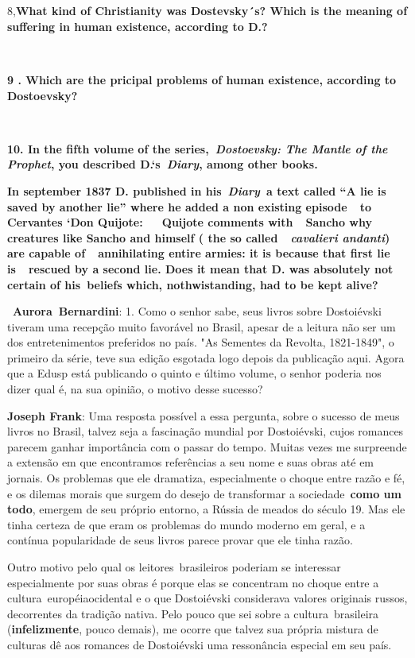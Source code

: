 ~

~

8,\textbf{What kind of Christianity was Dostevsky´s? Which is the
meaning of suffering in human existence, according to D.?}

\textbf{~}

\textbf{9 . Which are the pricipal problems of human existence,
according to Dostoevsky?}

\textbf{~}

\textbf{10. In the fifth volume of the series,~\emph{Dostoevsky: The
Mantle of the Prophet}, you described D.`s\emph{~Diary}, among other
books.}

\textbf{In september 1837 D. published in his~\emph{Diary}~a text called
``A lie is saved by another lie'' where he added a non existing
episode~~to Cervantes `Don Quijote:~~~Quijote comments with~~Sancho why
creatures like Sancho and himself ( the so called~~\emph{cavalieri
andanti}) are capable of~~annihilating entire armies: it is because that
first lie is~~rescued by a second lie. Does it mean that D. was
absolutely not certain of his~beliefs which, nothwistanding, had to be
kept alive?~~}

~\textbf{Aurora~Bernardini}: 1. Como o senhor sabe, seus livros sobre
Dostoiévski tiveram uma recepção muito favorável no Brasil, apesar de a
leitura não ser um dos entretenimentos preferidos no país. "As Sementes
da Revolta, 1821-1849", o primeiro da série, teve sua edição esgotada
logo depois da publicação aqui. Agora que a Edusp está publicando o
quinto e último volume, o senhor poderia nos dizer qual é, na sua
opinião, o motivo desse sucesso?

\textbf{Joseph Frank}: Uma resposta possível a essa pergunta, sobre o
sucesso de meus livros no Brasil, talvez seja a fascinação mundial por
Dostoiévski, cujos romances parecem ganhar importância com o passar do
tempo. Muitas vezes me surpreende a extensão em que encontramos
referências a seu nome e suas obras até em jornais. Os problemas que ele
dramatiza, especialmente o choque entre razão e fé, e os dilemas morais
que surgem do desejo de transformar a sociedade~\textbf{como um todo},
emergem de seu próprio entorno, a Rússia de meados do século 19. Mas ele
tinha certeza de que eram os problemas do mundo moderno em geral, e a
contínua popularidade de seus livros parece provar que ele tinha razão.

Outro motivo pelo qual os leitores~brasileiros poderiam se interessar
especialmente por suas obras é porque elas se concentram no choque entre
a cultura~européiaocidental e o que Dostoiévski considerava valores
originais russos, decorrentes da tradição nativa. Pelo pouco que sei
sobre a cultura~brasileira (\textbf{infelizmente}, pouco demais), me
ocorre que talvez sua própria mistura de culturas dê aos romances de
Dostoiévski uma ressonância especial em seu país.

